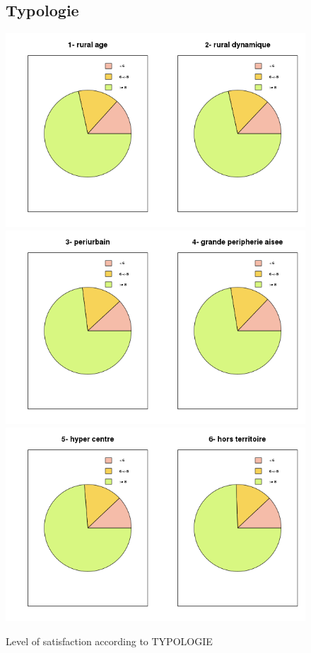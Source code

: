 \documentclass[a4paper, 11pt]{article}
\begin{document}
    \begin{figure}[!ht]
    \subsection{Typologie}
    	\centering
            \includegraphics[width = 10 cm]{Remi/Level_of_satisfaction_according_to_TYPOLOGIE2.png}
            \includegraphics[width = 10 cm]{Remi/Level_of_satisfaction_according_to_TYPOLOGIE4.png}
            \includegraphics[width = 10 cm]{Remi/Level_of_satisfaction_according_to_TYPOLOGIE6.png}
            \caption{Level of satisfaction according to TYPOLOGIE}
            \label{fig:TYPOLOGIE2}
    \end{figure}
\end{document}
